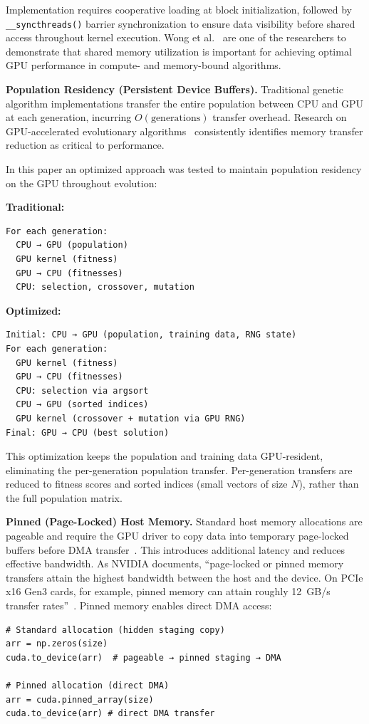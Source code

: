 Implementation requires cooperative loading at block initialization, followed by \texttt{\_\_syncthreads()} barrier synchronization to ensure data visibility before shared access throughout kernel execution. Wong et al.~\cite{wong2012cuda} are one of the researchers to demonstrate that shared memory utilization is important for achieving optimal GPU performance in compute- and memory-bound algorithms.     

\textbf{Population Residency (Persistent Device Buffers).} Traditional genetic algorithm implementations transfer the entire population between CPU and GPU at each generation, incurring $O(\text{generations})$ transfer overhead. Research on GPU-accelerated evolutionary algorithms~\cite{li2018accelerating,luong2013gpu} consistently identifies memory transfer reduction as critical to performance.

In this paper an optimized approach was tested to maintain population residency on the GPU throughout evolution:

\textbf{Traditional:}
\begin{verbatim}
For each generation:
  CPU → GPU (population)
  GPU kernel (fitness)
  GPU → CPU (fitnesses)
  CPU: selection, crossover, mutation
\end{verbatim}

\textbf{Optimized:}
\begin{verbatim}
Initial: CPU → GPU (population, training data, RNG state)
For each generation:
  GPU kernel (fitness)
  GPU → CPU (fitnesses)
  CPU: selection via argsort
  CPU → GPU (sorted indices)
  GPU kernel (crossover + mutation via GPU RNG)
Final: GPU → CPU (best solution)
\end{verbatim}

This optimization keeps the population and training data GPU-resident, eliminating the per-generation population transfer. Per-generation transfers are reduced to fitness scores and sorted indices (small vectors of size $N$), rather than the full population matrix.

\textbf{Pinned (Page-Locked) Host Memory.} Standard host memory allocations are pageable
and require the GPU driver to copy data into temporary page-locked buffers before DMA
transfer~\cite{harris2012optimize,mao2020pinned}. This introduces additional latency and
reduces effective bandwidth. As NVIDIA documents, ``page-locked or pinned memory transfers
attain the highest bandwidth between the host and the device. On PCIe x16 Gen3 cards, for
example, pinned memory can attain roughly 12~GB/s transfer rates''~\cite{nvidia2024cuda}.
Pinned memory enables direct DMA access:
\begin{verbatim}
# Standard allocation (hidden staging copy)
arr = np.zeros(size)
cuda.to_device(arr)  # pageable → pinned staging → DMA

# Pinned allocation (direct DMA)
arr = cuda.pinned_array(size)
cuda.to_device(arr) # direct DMA transfer
\end{verbatim}

